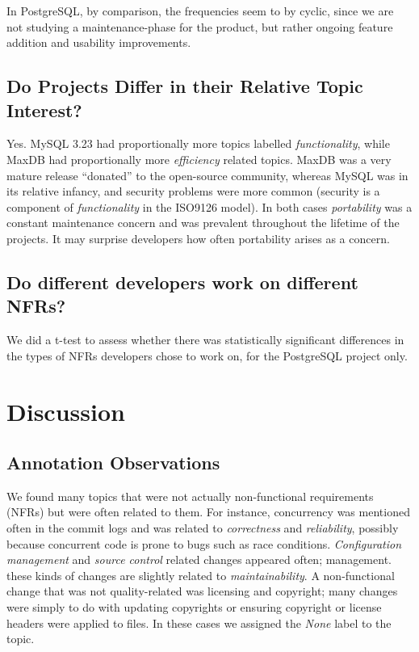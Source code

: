 \documentclass[smallextended]{svjour3}       %
\begin{document}
In PostgreSQL, by comparison, the frequencies seem to by cyclic, since we are not studying a maintenance-phase for the product, but rather ongoing
feature addition and usability improvements.

\subsection{Do Projects Differ in their Relative  Topic Interest?}
Yes. MySQL 3.23 had proportionally more
topics labelled \emph{functionality}, while MaxDB had proportionally more
\emph{efficiency} related topics. MaxDB was a very mature release ``donated'' to the open-source community, 
whereas MySQL was in its relative infancy, and	
security problems were more common (security is a component of \emph{functionality} in the ISO9126 model). 
In both cases \emph{portability} was a constant maintenance concern and was prevalent throughout the lifetime of the projects. It may surprise developers
how often portability arises as a concern.

\subsection{Do different developers work on different NFRs?}
We did a t-test to assess whether there was statistically significant differences in the types of NFRs developers chose to work on, for the PostgreSQL project only. 

\section{Discussion}
\label{sec:limit}

\subsection{Annotation Observations}
We found many topics that were not actually non-functional requirements (NFRs) but were often related to them. 
For instance, concurrency was mentioned often in the commit logs and
was related to \emph{correctness} and \emph{reliability}, possibly because concurrent code is prone to bugs such as race conditions. %
\emph{Configuration management} and \emph{source control} related changes appeared often; %
management. 
these kinds of changes are slightly related to \emph{maintainability}. 
A non-functional change that was not quality-related was licensing and
copyright; many changes were simply to do with updating copyrights or
ensuring copyright or license headers were applied to files. In these
cases we assigned the \emph{None} label to the topic.
\end{document}
